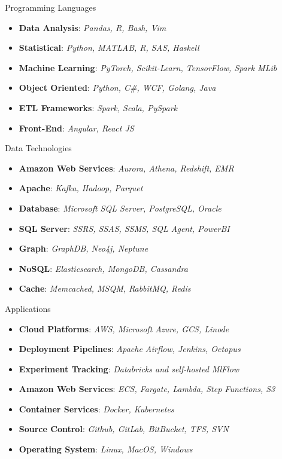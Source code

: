 
\Technology
{Programming Languages}
{\begin{itemize}
     \item \textbf{Data Analysis}:
       \emph{Pandas, R, Bash, Vim}
     \item \textbf{Statistical}:
       \emph{Python, MATLAB, R, SAS, Haskell}
     \item \textbf{Machine Learning}:
       \emph{PyTorch, Scikit-Learn, TensorFlow, Spark MLib}
     \item \textbf{Object Oriented}:
       \emph{Python, C\#, WCF, Golang, Java}
     \item \textbf{ETL Frameworks}:
       \emph{Spark, Scala, PySpark}
     \item \textbf{Front-End}:
       \emph{Angular, React JS}
\end{itemize}}

\vspace*{0.01 in}

\Technology
{Data Technologies}
{\begin{itemize}
     \item \textbf{Amazon Web Services}:
       \emph{Aurora, Athena, Redshift, EMR}
     \item \textbf{Apache}:
       \emph{Kafka, Hadoop, Parquet}
     \item \textbf{Database}:
       \emph{Microsoft SQL Server, PostgreSQL, Oracle}
     \item \textbf{SQL Server}:
       \emph{SSRS, SSAS, SSMS, SQL Agent, PowerBI}
     \item \textbf{Graph}:
       \emph{GraphDB, Neo4j, Neptune}
     \item \textbf{NoSQL}:
       \emph{Elasticsearch, MongoDB, Cassandra}
     \item \textbf{Cache}:
       \emph{Memcached, MSQM, RabbitMQ, Redis}
\end{itemize}}

\vspace*{0.01 in}

\Technology
{Applications}
{\begin{itemize}
      \item \textbf{Cloud Platforms}:
        \emph{AWS, Microsoft Azure, GCS, Linode}
      \item \textbf{Deployment Pipelines}:
      \emph{Apache Airflow, Jenkins, Octopus}
      \item \textbf{Experiment Tracking}:
        \emph{Databricks and self-hosted MlFlow}
      \item \textbf{Amazon Web Services}:
        \emph{ECS, Fargate, Lambda, Step Functions, S3}
      \item \textbf{Container Services}:
        \emph{Docker, Kubernetes}
      \item \textbf{Source Control}:
        \emph{Github, GitLab, BitBucket, TFS, SVN}
      \item \textbf{Operating System}:
        \emph{Linux, MacOS, Windows}
\end{itemize}}
